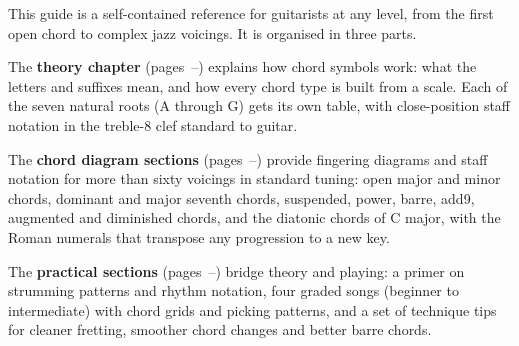 \documentclass[a4paper,10pt]{article}
\begin{document}
\thispagestyle{empty}


\vspace*{5.4cm}

\noindent
This guide is a self-contained reference for guitarists at any level,
from the first open chord to complex jazz voicings.
It is organised in three parts.

\medskip
\noindent
The \textbf{theory chapter}
(pages~\pageref{deb-theorie}--\pageref{fin-theorie}) explains how chord
symbols work: what the letters and suffixes mean, and how every chord
type is built from a scale.
Each of the seven natural roots (A through G) gets its own table,
with close-position staff notation in the treble-8 clef standard
to guitar.

\medskip
\noindent
The \textbf{chord diagram sections}
(pages~\pageref{deb-diagrammes}--\pageref{fin-diagrammes}) provide
fingering diagrams and staff notation for more than sixty voicings
in standard tuning: open major and minor chords, dominant and major
seventh chords, suspended, power, barre, add9, augmented and
diminished chords, and the diatonic chords of C major, with the Roman
numerals that transpose any progression to a new key.

\medskip
\noindent
The \textbf{practical sections}
(pages~\pageref{deb-pratique}--\pageref{fin-pratique}) bridge theory and
playing: a primer on strumming patterns and rhythm notation, four
graded songs (beginner to intermediate) with chord grids and
picking patterns, and a set of technique tips for cleaner fretting,
smoother chord changes and better barre chords.
\end{document}
